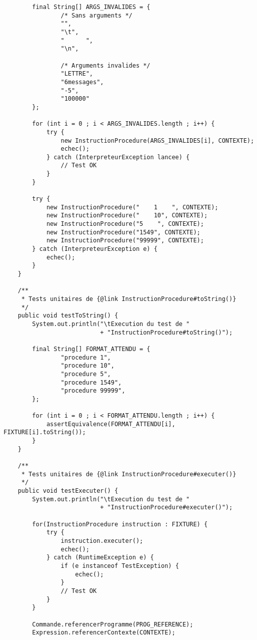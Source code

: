 \begin{enum}
\begin{verbatim}
        final String[] ARGS_INVALIDES = {
                /* Sans arguments */
                "",
                "\t",
                "      ",
                "\n",
                
                /* Arguments invalides */
                "LETTRE",
                "6messages",
                "-5",
                "100000"
        };
        
        for (int i = 0 ; i < ARGS_INVALIDES.length ; i++) {
            try {
                new InstructionProcedure(ARGS_INVALIDES[i], CONTEXTE);
                echec();
            } catch (InterpreteurException lancee) {
                // Test OK
            }
        }
        
        try {
            new InstructionProcedure("    1    ", CONTEXTE);
            new InstructionProcedure("    10", CONTEXTE);
            new InstructionProcedure("5    ", CONTEXTE);
            new InstructionProcedure("1549", CONTEXTE);
            new InstructionProcedure("99999", CONTEXTE);
        } catch (InterpreteurException e) {
            echec();
        }
    }
    
    /**
     * Tests unitaires de {@link InstructionProcedure#toString()}
     */
    public void testToString() {
        System.out.println("\tExecution du test de "
                           + "InstructionProcedure#toString()");
        
        final String[] FORMAT_ATTENDU = {
                "procedure 1",
                "procedure 10",
                "procedure 5",
                "procedure 1549",
                "procedure 99999",
        };
        
        for (int i = 0 ; i < FORMAT_ATTENDU.length ; i++) {
            assertEquivalence(FORMAT_ATTENDU[i], FIXTURE[i].toString());
        }
    }
    
    /**
     * Tests unitaires de {@link InstructionProcedure#executer()}
     */
    public void testExecuter() {
        System.out.println("\tExecution du test de "
                           + "InstructionProcedure#executer()");
        
        for(InstructionProcedure instruction : FIXTURE) {
            try {
                instruction.executer();
                echec();
            } catch (RuntimeException e) {
                if (e instanceof TestException) {
                    echec();
                }
                // Test OK
            }
        }
        
        Commande.referencerProgramme(PROG_REFERENCE);
        Expression.referencerContexte(CONTEXTE);
        

\end{verbatim}
\end{enum}
